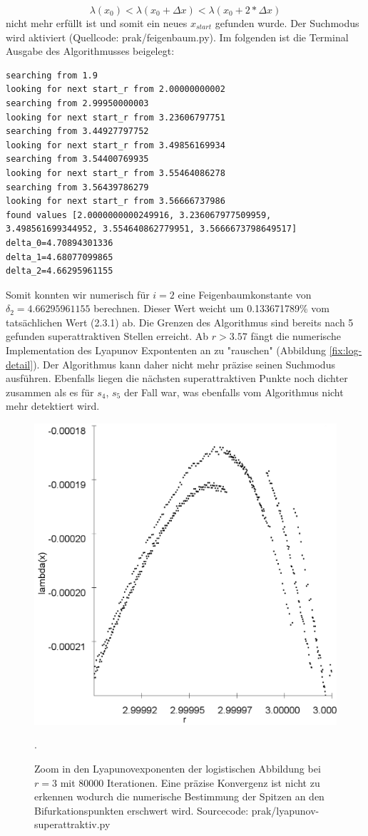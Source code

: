 \documentclass{scrartcl}
\begin{document}
\begin{equation}
\lambda(x_0) < \lambda(x_0 + \Delta x) < \lambda(x_0 + 2*\Delta x)
\end{equation}
nicht mehr erfüllt ist und somit ein neues $x_{start}$ gefunden wurde. Der Suchmodus wird aktiviert  (Quellcode: prak/feigenbaum.py).
Im folgenden ist die Terminal Ausgabe des Algorithmusses beigelegt:
\begin{lstlisting}
searching from 1.9
looking for next start_r from 2.00000000002
searching from 2.99950000003
looking for next start_r from 3.23606797751
searching from 3.44927797752
looking for next start_r from 3.49856169934
searching from 3.54400769935
looking for next start_r from 3.55464086278
searching from 3.56439786279
looking for next start_r from 3.56666737986
found values [2.0000000000249916, 3.236067977509959, 3.498561699344952, 3.554640862779951, 3.5666673798649517]
delta_0=4.70894301336
delta_1=4.68077099865
delta_2=4.66295961155
\end{lstlisting}
Somit konnten wir numerisch für $i=2$ eine Feigenbaumkonstante von $\delta_2=4.66295961155$ berechnen. Dieser Wert weicht um 0.133671789\% vom tatsächlichen Wert (2.3.1) ab. Die Grenzen des Algorithmus sind bereits nach 5 gefunden superattraktiven Stellen erreicht. Ab $r>3.57$ fängt die numerische Implementation des Lyapunov Expontenten an zu "rauschen" (Abbildung \ref{fix:log-detail}). Der Algorithmus kann daher nicht mehr präzise seinen Suchmodus ausführen. Ebenfalls liegen die nächsten superattraktiven Punkte noch dichter zusammen als es für $s_4$, $s_5$ der Fall war, was ebenfalls vom Algorithmus nicht mehr detektiert wird. 
\begin{figure}
\centering
\includegraphics[scale=0.20]{lya-rauschen}
\caption{Zoom in den Lyapunovexponenten der logistischen Abbildung bei $r=3$ mit 80000 Iterationen. 
Eine präzise Konvergenz ist nicht zu erkennen wodurch die numerische Bestimmung der Spitzen an den Bifurkationspunkten erschwert wird. Sourcecode: prak/lyapunov-superattraktiv.py}. 
\label{fig:lya-rauschen}
\end{figure}
\end{document}
